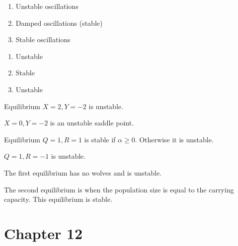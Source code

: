 \documentclass[]{memoir}
\begin{document}
\begin{enumerate}
\def\labelenumi{\arabic{enumi}.}
\itemsep1pt\parskip0pt
\item
  Unstable oscillations
\item
  Damped oscillations (stable)
\item
  Stable oscillations
\end{enumerate}


\begin{enumerate}
\def\labelenumi{\arabic{enumi}.}
\itemsep1pt\parskip0pt
\item
  Unstable
\item
  Stable
\item
  Unstable
\end{enumerate}


Equilibrium $X=2, Y=-2$ is unstable.

$X=0, Y=-2$ is an unstable saddle point.


Equilibrium $Q=1, R=1$ is stable if $\alpha \geq 0$. Otherwise it is
unstable.

$Q=1, R=-1$ is unstable.


The first equilibrium has no wolves and is unstable.

The second equilibrium is when the population size is equal to the
carrying capacity. This equilibrium is stable.

\section{Chapter 12}
\end{document}
